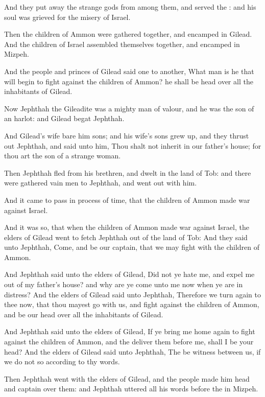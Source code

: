 \Verse And they put away the strange gods from among them, and served the \LORD: and his soul was grieved for the misery of Israel.

\Verse Then the children of Ammon were gathered together, and encamped in Gilead. And the children of Israel assembled themselves together, and encamped in Mizpeh.

\Verse And the people and princes of Gilead said one to another, What man is he that will begin to fight against the children of Ammon? he shall be head over all the inhabitants of Gilead.


\Chapter
\Verse Now Jephthah the Gileadite was a mighty man of valour, and he was the son of an harlot: and Gilead begat Jephthah.

\Verse And Gilead's wife bare him sons; and his wife's sons grew up, and they thrust out Jephthah, and said unto him, Thou shalt not inherit in our father's house; for thou art the son of a strange woman.

\Verse Then Jephthah fled from his brethren, and dwelt in the land of Tob: and there were gathered vain men to Jephthah, and went out with him.

\Verse And it came to pass in process of time, that the children of Ammon made war against Israel.

\Verse And it was so, that when the children of Ammon made war against Israel, the elders of Gilead went to fetch Jephthah out of the land of Tob: \Verse And they said unto Jephthah, Come, and be our captain, that we may fight with the children of Ammon.

\Verse And Jephthah said unto the elders of Gilead, Did not ye hate me, and expel me out of my father's house? and why are ye come unto me now when ye are in distress?  \Verse And the elders of Gilead said unto Jephthah, Therefore we turn again to thee now, that thou mayest go with us, and fight against the children of Ammon, and be our head over all the inhabitants of Gilead.

\Verse And Jephthah said unto the elders of Gilead, If ye bring me home again to fight against the children of Ammon, and the \LORD deliver them before me, shall I be your head?  \Verse And the elders of Gilead said unto Jephthah, The \LORD be witness between us, if we do not so according to thy words.

\Verse Then Jephthah went with the elders of Gilead, and the people made him head and captain over them: and Jephthah uttered all his words before the \LORD in Mizpeh.

